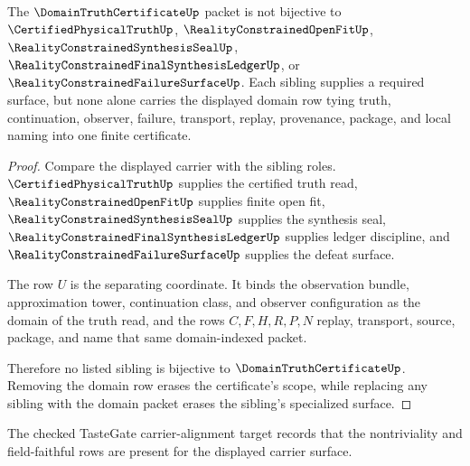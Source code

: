 \begin{theorem}
\label{thm:domain-truth-certificate-independence}
The $\DomainTruthCertificateUp$ packet is not bijective to $\CertifiedPhysicalTruthUp$, $\RealityConstrainedOpenFitUp$, $\RealityConstrainedSynthesisSealUp$, $\RealityConstrainedFinalSynthesisLedgerUp$, or $\RealityConstrainedFailureSurfaceUp$. Each sibling supplies a required surface, but none alone carries the displayed domain row tying truth, continuation, observer, failure, transport, replay, provenance, package, and local naming into one finite certificate.
\end{theorem}
\begin{proof}
Compare the displayed carrier with the sibling roles. $\CertifiedPhysicalTruthUp$ supplies the certified truth read, $\RealityConstrainedOpenFitUp$ supplies finite open fit, $\RealityConstrainedSynthesisSealUp$ supplies the synthesis seal, $\RealityConstrainedFinalSynthesisLedgerUp$ supplies ledger discipline, and $\RealityConstrainedFailureSurfaceUp$ supplies the defeat surface.

The row $U$ is the separating coordinate. It binds the observation bundle, approximation tower, continuation class, and observer configuration as the domain of the truth read, and the rows $C,F,H,R,P,N$ replay, transport, source, package, and name that same domain-indexed packet.

Therefore no listed sibling is bijective to $\DomainTruthCertificateUp$. Removing the domain row erases the certificate's scope, while replacing any sibling with the domain packet erases the sibling's specialized surface.
\end{proof}



The checked TasteGate carrier-alignment target records that the nontriviality and field-faithful rows are present for the displayed carrier surface.

